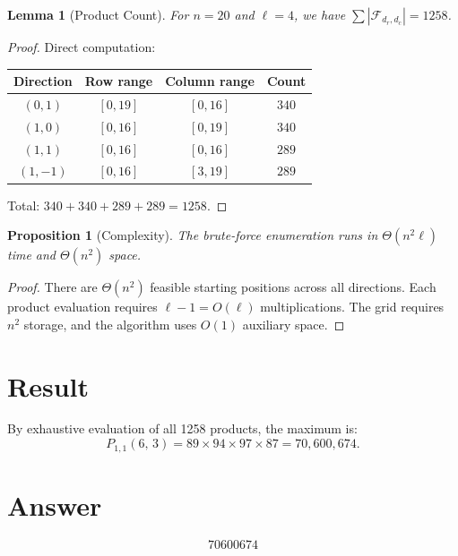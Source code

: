\documentclass[12pt]{article}
\newtheorem{lemma}[theorem]{Lemma}
\newtheorem{proposition}[theorem]{Proposition}
\theoremstyle{definition}
\begin{document}
\begin{lemma}[Product Count]
For $n = 20$ and $\ell = 4$, we have $\sum |\mathcal{F}_{d_r,d_c}| = 1258$.
\end{lemma}

\begin{proof}
Direct computation:
\begin{center}
\begin{tabular}{cccc}
Direction & Row range & Column range & Count \\
\hline
$(0,1)$ & $[0,19]$ & $[0,16]$ & $340$ \\
$(1,0)$ & $[0,16]$ & $[0,19]$ & $340$ \\
$(1,1)$ & $[0,16]$ & $[0,16]$ & $289$ \\
$(1,-1)$ & $[0,16]$ & $[3,19]$ & $289$ \\
\end{tabular}
\end{center}
Total: $340 + 340 + 289 + 289 = 1258$.
\end{proof}

\begin{proposition}[Complexity]
The brute-force enumeration runs in $\Theta(n^2 \ell)$ time and $\Theta(n^2)$ space.
\end{proposition}

\begin{proof}
There are $\Theta(n^2)$ feasible starting positions across all directions. Each product evaluation requires $\ell - 1 = O(\ell)$ multiplications. The grid requires $n^2$ storage, and the algorithm uses $O(1)$ auxiliary space.
\end{proof}

\section{Result}

By exhaustive evaluation of all 1258 products, the maximum is:
\[
P_{1,1}(6,\, 3) = 89 \times 94 \times 97 \times 87 = 70{,}600{,}674.
\]

\section{Answer}

\[
\boxed{70600674}
\]
\end{document}
